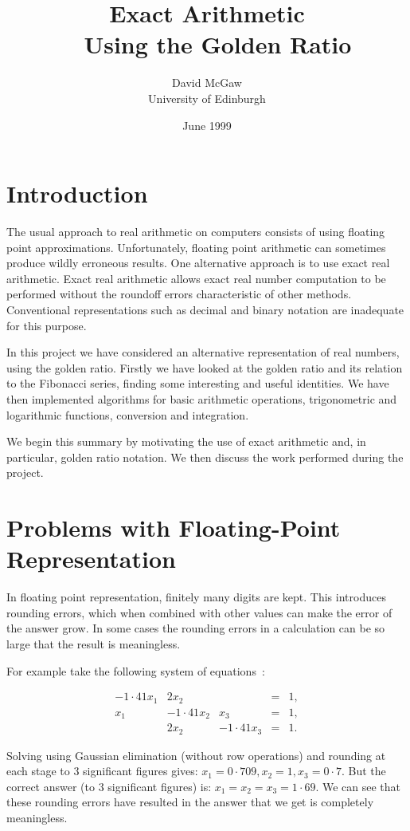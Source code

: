 \documentclass[12pt]{article}
\title{Exact Arithmetic \\~ Using the Golden Ratio}
\author{David McGaw  \\  
        University of Edinburgh}
\date{June 1999}
\begin{document}
\maketitle

\section{Introduction} \label{ch:I}

The usual approach to real arithmetic on computers consists of using
floating point approximations. Unfortunately, floating point
arithmetic can sometimes produce wildly erroneous results. One
alternative approach is to use exact real arithmetic. Exact real
arithmetic allows exact real number computation to be performed
without the roundoff errors characteristic of other methods.
Conventional representations such as decimal and binary notation are
inadequate for this purpose. 

In this project we have considered an alternative representation
of real numbers, using the golden ratio. Firstly we have looked at the golden
ratio and its relation to the Fibonacci series, finding some
interesting and useful identities. We have then implemented algorithms for
basic arithmetic operations, trigonometric and logarithmic functions,
conversion and integration. 

We begin this summary by motivating the use of exact arithmetic and,
in particular, golden ratio notation. We then discuss the work
performed during the project.

\section{Problems with Floating-Point Representation}

In floating point representation, finitely many digits are kept.  This
introduces rounding errors, which when combined with other values can
make the error of the answer grow.  In some cases the rounding errors
in a calculation can be so large that the result is meaningless.

For example take the following system of equations~\cite{kn:Hall}:
\begin{center}
\[
\begin{array}{ccccc}
-1 \cdot 41x_{1} & 2x_{2} & & = & 1, \\
x_{1} & -1 \cdot 41x_{2} & x_{3} & = & 1, \\
 & 2x_{2} & -1 \cdot 41x_{3} & = & 1.
\end{array}
\]
\end{center}
Solving using Gaussian elimination (without row operations) and
rounding at each stage to 3 significant figures gives: \( x_{1}=0 \cdot 709,
x_{2}=1, x_{3}=0 \cdot 7.\) But the correct answer (to 3 significant
figures) is: \( x_{1}=x_{2}=x_{3}=1 \cdot 69. \) We can see that these
rounding errors have resulted in the answer that we get is completely
meaningless.
\end{document}
